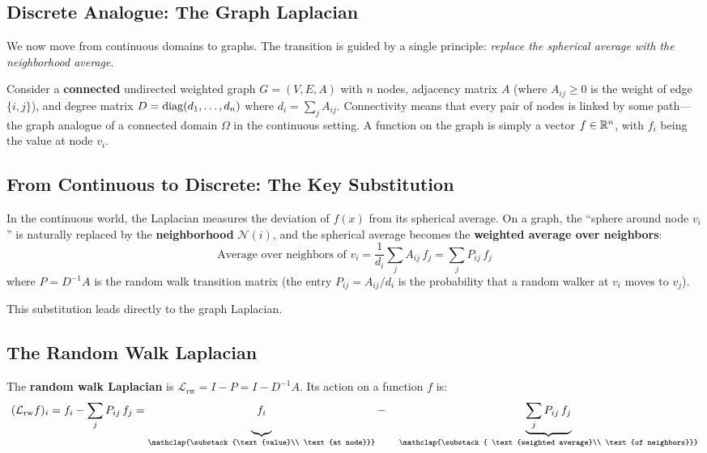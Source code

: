 \begin{notechapter}
\section{Discrete Analogue: The Graph Laplacian}
\label{harmonic-functions:sec:graph_laplacian}

We now move from continuous domains to graphs. The transition is guided by a
single principle: \emph{replace the spherical average with the neighborhood
average}.

Consider a \textbf{connected} undirected weighted graph $G = (V, E, A)$ with
$n$ nodes, adjacency matrix $A$ (where $A_{ij} \geq 0$ is the weight of edge
$\{i,j\}$), and degree matrix $D = \operatorname{diag}(d_1, \ldots, d_n)$ where
$d_i = \sum_j A_{ij}$. Connectivity means that every pair of nodes is linked
by some path---the graph analogue of a connected domain $\Omega$ in the
continuous setting. A function on the graph is simply a vector
$f \in \mathbb{R}^n$, with $f_i$ being the value at node $v_i$.

\subsection{From Continuous to Discrete: The Key Substitution}

In the continuous world, the Laplacian measures the deviation of $f(x)$ from
its spherical average. On a graph, the ``sphere around node $v_i$'' is
naturally replaced by the \textbf{neighborhood} $\mathcal{N}(i)$, and the
spherical average becomes the \textbf{weighted average over neighbors}:
\begin{equation}
\text{Average over neighbors of } v_i
= \frac{1}{d_i}\sum_{j} A_{ij}\,f_j
= \sum_j P_{ij}\,f_j
\end{equation}
where $P = D^{-1}A$ is the random walk transition matrix (the entry $P_{ij}
= A_{ij}/d_i$ is the probability that a random walker at $v_i$ moves to
$v_j$).

This substitution leads directly to the graph Laplacian.

\subsection{The Random Walk Laplacian}

\begin{definition}
\label{harmonic-functions:def:rw_laplacian}
The \textbf{random walk Laplacian} is $\mathcal{L}_{\mathrm{rw}} = I - P
= I - D^{-1}A$. Its action on a function $f$ is:
\begin{equation}
(\mathcal{L}_{\mathrm{rw}} f)_i
= f_i - \sum_j P_{ij}\,f_j
= \underbrace{f_i\vphantom{\sum_j}}_{\mathclap{\substack{\text{value}\\
  \text{at node}}}}
  - \quad \underbrace{\sum_j P_{ij}\,f_j}_{\mathclap{\substack{
  \text{weighted average}\\ \text{of neighbors}}}}
\end{equation}
\end{definition}


\end{notechapter}
